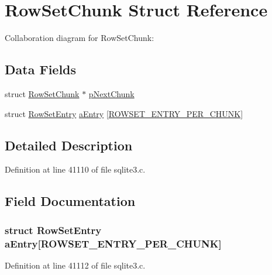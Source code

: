 \hypertarget{struct_row_set_chunk}{}\section{Row\+Set\+Chunk Struct Reference}
\label{struct_row_set_chunk}


Collaboration diagram for Row\+Set\+Chunk\+:
\subsection*{Data Fields}
\begin{DoxyCompactItemize}
\item 
struct \hyperlink{struct_row_set_chunk}{Row\+Set\+Chunk} $\ast$ \hyperlink{struct_row_set_chunk_a2093666264de5b293f2a4d1b8c53d257}{p\+Next\+Chunk}
\item 
struct \hyperlink{struct_row_set_entry}{Row\+Set\+Entry} \hyperlink{struct_row_set_chunk_a1551d41fc75bcfc75b3a773333822fe7}{a\+Entry} \mbox{[}\hyperlink{sqlite3_8c_a351eaade204118dea320a04b9a584b10}{R\+O\+W\+S\+E\+T\+\_\+\+E\+N\+T\+R\+Y\+\_\+\+P\+E\+R\+\_\+\+C\+H\+U\+N\+K}\mbox{]}
\end{DoxyCompactItemize}


\subsection{Detailed Description}


Definition at line 41110 of file sqlite3.\+c.



\subsection{Field Documentation}
\hypertarget{struct_row_set_chunk_a1551d41fc75bcfc75b3a773333822fe7}{}
\subsubsection[{a\+Entry}]{\setlength{\rightskip}{0pt plus 5cm}struct {\bf Row\+Set\+Entry} a\+Entry\mbox{[}{\bf R\+O\+W\+S\+E\+T\+\_\+\+E\+N\+T\+R\+Y\+\_\+\+P\+E\+R\+\_\+\+C\+H\+U\+N\+K}\mbox{]}}\label{struct_row_set_chunk_a1551d41fc75bcfc75b3a773333822fe7}


Definition at line 41112 of file sqlite3.\+c.

\hypertarget{struct_row_set_chunk_a2093666264de5b293f2a4d1b8c53d257}{}
